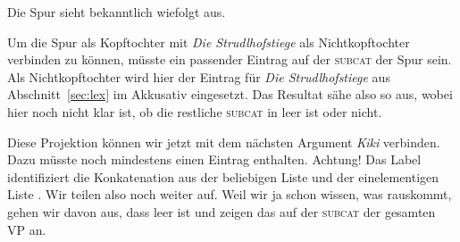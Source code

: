 \documentclass[10pt,a3paper]{article}
\newcommand{\rot}[1]{\textcolor{rot}{#1}}
\newcommand{\orongsch}[1]{\textcolor{orongsch}{#1}}
\newcommand{\tuerkis}[1]{\textcolor{tuerkis}{#1}}
\newcommand{\braun}[1]{\textcolor{braun}{#1}}
\newcommand*{\mybox}[1]{\framebox{#1}}
\newcommand{\Zeile}{\vspace{\baselineskip}}
\begin{document}
Die Spur sieht bekanntlich wiefolgt aus.

\Zeile


\Zeile

Um die Spur als Kopftochter mit \textit{Die Strudlhofstiege} als Nichtkopftochter verbinden zu können, müsste ein passender Eintrag auf der \textsc{subcat} der Spur sein.
Als Nichtkopftochter wird hier der \orongsch{Eintrag für \textit{Die Strudlhofstiege}} aus Abschnitt~\ref{sec:lex} im Akkusativ eingesetzt.
Das Resultat sähe also so aus, wobei hier noch nicht klar ist, ob die restliche \textsc{subcat} in \braun{\mybox{102}} leer ist oder nicht.

\Zeile


\newpage

Diese Projektion können wir jetzt mit dem nächsten Argument \textit{Kiki} verbinden.
Dazu müsste \braun{\mybox{102}} noch mindestens einen Eintrag enthalten.
Achtung! Das Label \mybox{102} identifiziert die Konkatenation aus der beliebigen Liste \mybox{103} und der einelementigen Liste \mybox{104}.
Wir teilen \mybox{102} also noch weiter auf.
Weil wir ja schon wissen, was rauskommt, gehen wir davon aus, dass \mybox{103} leer ist und zeigen das auf der \textsc{subcat} der gesamten VP an.
\end{document}
